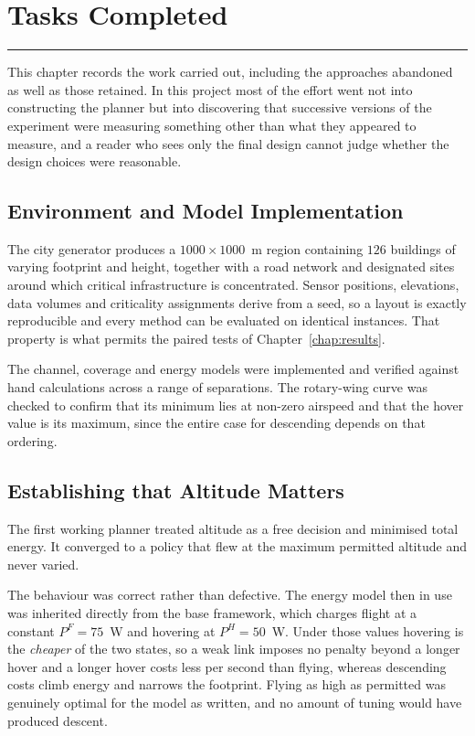 \chapter{Tasks Completed}
\label{chap:tasks}
\noindent \rule{6.6in}{0.01in}
\minitoc
\newpage

This chapter records the work carried out, including the approaches abandoned as well as those retained. In this project most of the effort went not into constructing the planner but into discovering that successive versions of the experiment were measuring something other than what they appeared to measure, and a reader who sees only the final design cannot judge whether the design choices were reasonable.

\section{Environment and Model Implementation}

The city generator produces a $1000 \times 1000$~m region containing $126$ buildings of varying footprint and height, together with a road network and designated sites around which critical infrastructure is concentrated. Sensor positions, elevations, data volumes and criticality assignments derive from a seed, so a layout is exactly reproducible and every method can be evaluated on identical instances. That property is what permits the paired tests of Chapter~\ref{chap:results}.

The channel, coverage and energy models were implemented and verified against hand calculations across a range of separations. The rotary-wing curve was checked to confirm that its minimum lies at non-zero airspeed and that the hover value is its maximum, since the entire case for descending depends on that ordering.

\section{Establishing that Altitude Matters}
\label{sec:tasks_altitude}

The first working planner treated altitude as a free decision and minimised total energy. It converged to a policy that flew at the maximum permitted altitude and never varied.

The behaviour was correct rather than defective. The energy model then in use was inherited directly from the base framework, which charges flight at a constant $P^F = 75$~W and hovering at $P^H = 50$~W. Under those values hovering is the \emph{cheaper} of the two states, so a weak link imposes no penalty beyond a longer hover and a longer hover costs less per second than flying, whereas descending costs climb energy and narrows the footprint. Flying as high as permitted was genuinely optimal for the model as written, and no amount of tuning would have produced descent.

